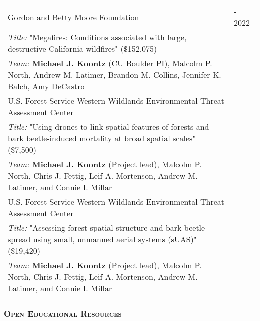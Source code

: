 \documentclass[10pt,english]{article}
\providecommand{\tabularnewline}{\\}
\begin{document}
\renewcommand{\arraystretch}{1.2}
\begin{tabularx}{\textwidth}{@{}>{\raggedright}p{5.25in} >{\raggedleft}X@{}}
Gordon and Betty Moore Foundation & 2020 - 2022 \tabularnewline
\addtolength{\leftskip}{5ex}\emph{Title:} "Megafires: Conditions associated with large, destructive California wildfires" (\$152,075) & \tabularnewline
\addtolength{\leftskip}{5ex}\emph{Team:} \textbf{Michael J. Koontz} (CU Boulder PI), Malcolm P. North, Andrew M. Latimer, Brandon M. Collins, Jennifer K. Balch, Amy DeCastro & \tabularnewline

U.S. Forest Service Western Wildlands Environmental Threat Assessment Center & 2018 \tabularnewline
\addtolength{\leftskip}{5ex}\emph{Title:} "Using drones to link spatial features of forests and bark beetle-induced mortality at broad spatial scales" (\$7,500) & \tabularnewline
\addtolength{\leftskip}{5ex}\emph{Team:} \textbf{Michael J. Koontz} (Project lead), Malcolm P. North, Chris J. Fettig, Leif A. Mortenson, Andrew M. Latimer, and Connie I. Millar & \tabularnewline

U.S. Forest Service Western Wildlands Environmental Threat Assessment Center & 2017 \tabularnewline
\addtolength{\leftskip}{5ex}\emph{Title:} "Assessing forest spatial structure and bark beetle spread using small, unmanned aerial systems (sUAS)" (\$19,420) & \tabularnewline
\addtolength{\leftskip}{5ex}\emph{Team:} \textbf{Michael J. Koontz} (Project lead), Malcolm P. North, Chris J. Fettig, Leif A. Mortenson, Andrew M. Latimer, and Connie I. Millar & \tabularnewline
\end{tabularx}

\vspace{1ex}

\subsubsection*{\textsc{Open Educational Resources}}
\vspace{-0.5ex}
\end{document}
